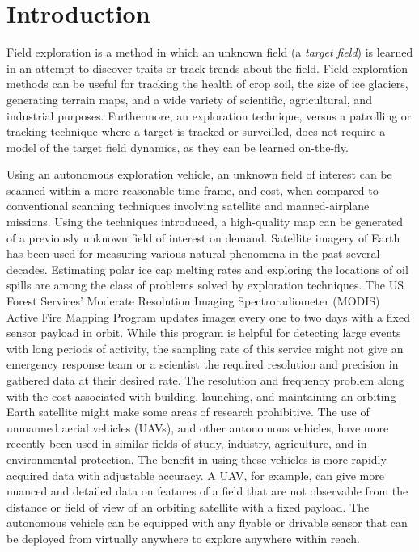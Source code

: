 
\chapter{Introduction}
Field exploration is a method in which an unknown field (a \textit{target field}) is learned in an attempt to discover traits or track trends about the field. Field exploration methods can be useful for tracking the health of crop soil, the size of ice glaciers, generating terrain maps, and a wide variety of scientific, agricultural, and industrial purposes. Furthermore, an exploration technique, versus a patrolling or tracking technique where a target is tracked or surveilled, does not require a model of the target field dynamics, as they can be learned on-the-fly.

Using an autonomous exploration vehicle, an unknown field of interest can be scanned within a more reasonable time frame, and cost, when compared to conventional scanning techniques involving satellite and manned-airplane missions. Using the techniques introduced, a high-quality map can be generated of a previously unknown field of interest on demand. Satellite imagery of Earth has been used for measuring various natural phenomena in the past several decades. Estimating polar ice cap melting rates and exploring the locations of oil spills are among the class of problems solved by exploration techniques. The US Forest Services' Moderate Resolution Imaging Spectroradiometer (MODIS) Active Fire Mapping Program updates images every one to two days with a fixed sensor payload in orbit. While this program is helpful for detecting large events with long periods of activity, the sampling rate of this service might not give an emergency response team or a scientist the required resolution and precision in gathered data at their desired rate. The resolution and frequency problem along with the cost associated with building, launching, and maintaining an orbiting Earth satellite might make some areas of research prohibitive. The use of unmanned aerial vehicles (UAVs), and other autonomous vehicles, have more recently been used in similar fields of study, industry, agriculture, and in environmental protection. The benefit in using these vehicles is more rapidly acquired data with adjustable accuracy. A UAV, for example, can give more nuanced and detailed data on features of a field that are not observable from the distance or field of view of an orbiting satellite with a fixed payload. The autonomous vehicle can be equipped with any flyable or drivable sensor that can be deployed from virtually anywhere to explore anywhere within reach.

